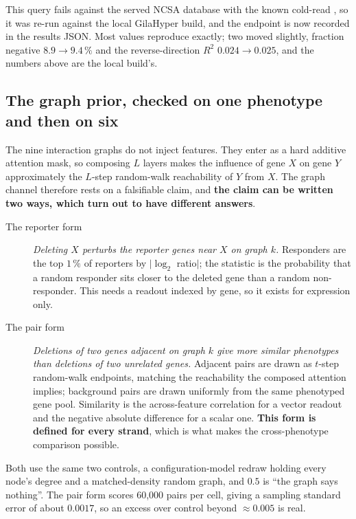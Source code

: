  This query fails against the served NCSA database
with the known cold-read , so it was re-run against the local GilaHyper
build, and the endpoint is now recorded in the results JSON. Most values reproduce exactly;
two moved slightly, fraction negative $8.9 \to 9.4\,\%$ and the reverse-direction $R^2$
$0.024 \to 0.025$, and the numbers above are the local build's.

\subsection{The graph prior, checked on one phenotype and then on six}
\label{sec:graph-probe}

The nine interaction graphs do not inject features. They enter as a hard additive attention
mask, so composing $L$ layers makes the influence of gene $X$ on gene $Y$ approximately the
$L$-step random-walk reachability of $Y$ from $X$. The graph channel therefore rests on a
falsifiable claim, and \textbf{the claim can be written two ways, which turn out to have
different answers}.

\begin{description}
\item[The reporter form] \emph{Deleting $X$ perturbs the reporter genes near $X$ on graph
  $k$.} Responders are the top $1\,\%$ of reporters by $|\log_2$ ratio$|$; the statistic is
  the probability that a random responder sits closer to the deleted gene than a random
  non-responder. This needs a readout indexed by gene, so it exists for expression only.
\item[The pair form] \emph{Deletions of two genes adjacent on graph $k$ give more similar
  phenotypes than deletions of two unrelated genes.} Adjacent pairs are drawn as $t$-step
  random-walk endpoints, matching the reachability the composed attention implies;
  background pairs are drawn uniformly from the same phenotyped gene pool. Similarity is the
  across-feature correlation for a vector readout and the negative absolute difference for a
  scalar one. \textbf{This form is defined for every strand}, which is what makes the
  cross-phenotype comparison possible.
\end{description}

Both use the same two controls, a configuration-model redraw holding every node's degree and
a matched-density random graph, and $0.5$ is ``the graph says nothing''. The pair form scores
60,000 pairs per cell, giving a sampling standard error of about $0.0017$, so an excess over
control beyond $\approx 0.005$ is real.

